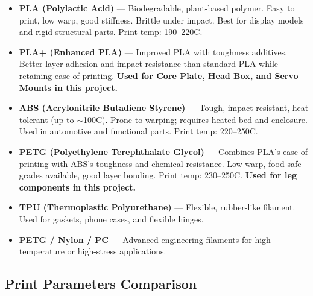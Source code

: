 \documentclass[12pt, a4paper]{article}
\begin{document}
\begin{itemize}[itemsep=4pt]
  \item \textbf{PLA (Polylactic Acid)} --- Biodegradable, plant-based polymer.
  Easy to print, low warp, good stiffness. Brittle under impact. Best for
  display models and rigid structural parts. Print temp: 190--220\textdegree C.

  \item \textbf{PLA+ (Enhanced PLA)} --- Improved PLA with toughness additives.
  Better layer adhesion and impact resistance than standard PLA while retaining
  ease of printing. \textbf{Used for Core Plate, Head Box, and Servo Mounts in
  this project.}

  \item \textbf{ABS (Acrylonitrile Butadiene Styrene)} --- Tough, impact
  resistant, heat tolerant (up to $\sim$100\textdegree C). Prone to warping;
  requires heated bed and enclosure. Used in automotive and functional parts.
  Print temp: 220--250\textdegree C.

  \item \textbf{PETG (Polyethylene Terephthalate Glycol)} --- Combines PLA's
  ease of printing with ABS's toughness and chemical resistance. Low warp,
  food-safe grades available, good layer bonding. Print temp: 230--250\textdegree C.
  \textbf{Used for leg components in this project.}

  \item \textbf{TPU (Thermoplastic Polyurethane)} --- Flexible, rubber-like
  filament. Used for gaskets, phone cases, and flexible hinges.

  \item \textbf{PETG / Nylon / PC} --- Advanced engineering filaments for
  high-temperature or high-stress applications.
\end{itemize}

\subsection{Print Parameters Comparison}
\end{document}
